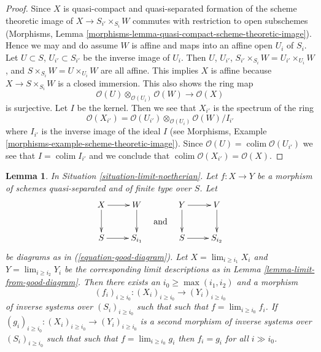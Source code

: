 \documentclass{stacks-project}
\theoremstyle{plain}
\newtheorem{lemma}[subsection]{Lemma}
\theoremstyle{definition}
\theoremstyle{remark}
\numberwithin{equation}{subsection}
\def\lim{\mathop{\mathrm{lim}}\nolimits}
\def\colim{\mathop{\mathrm{colim}}\nolimits}
\begin{document}
\begin{proof}
Since $X$ is quasi-compact and quasi-separated formation of the
scheme theoretic image of $X \to S_{i'} \times_{S_i} W$
commutes with restriction to open subschemes
(Morphisms, Lemma \ref{morphisms-lemma-quasi-compact-scheme-theoretic-image}).
Hence we may and do assume $W$ is affine and maps into an affine open
$U_i$ of $S_i$. Let $U \subset S$, $U_{i'} \subset S_{i'}$
be the inverse image of $U_i$. Then $U$, $U_{i'}$, 
$S_{i'} \times_{S_i} W = U_{i'} \times_{U_i} W$, and
$S \times_{S_i} W = U \times_{U_i} W$ are all affine.
This implies $X$ is affine because $X \to S \times_{S_i} W$ is
a closed immersion. This also shows the ring map
$$
\mathcal{O}(U) \otimes_{\mathcal{O}(U_i)} \mathcal{O}(W) \to
\mathcal{O}(X)
$$
is surjective. Let $I$ be the kernel. Then we see that $X_{i'}$
is the spectrum of the ring
$$
\mathcal{O}(X_{i'}) =
\mathcal{O}(U_{i'}) \otimes_{\mathcal{O}(U_i)} \mathcal{O}(W)/I_{i'}
$$
where $I_{i'}$ is the inverse image of the ideal $I$ (see
Morphisms, Example \ref{morphisms-example-scheme-theoretic-image}).
Since $\mathcal{O}(U) = \colim \mathcal{O}(U_{i'})$
we see that $I = \colim I_{i'}$ and we conclude
that $\colim \mathcal{O}(X_{i'}) = \mathcal{O}(X)$.
\end{proof}

\begin{lemma}
\label{lemma-morphism-good-diagram}
In Situation \ref{situation-limit-noetherian}.
Let $f : X \to Y$ be a morphism of schemes quasi-separated
and of finite type over $S$. Let
$$
\vcenter{
\xymatrix{
X \ar[r] \ar[d] & W \ar[d] \\
S \ar[r] & S_{i_1}
}
}
\quad\text{and}\quad
\vcenter{
\xymatrix{
Y \ar[r] \ar[d] & V \ar[d] \\
S \ar[r] & S_{i_2}
}
}
$$
be diagrams as in (\ref{equation-good-diagram}). Let
$X = \lim_{i \geq i_1} X_i$ and
$Y = \lim_{i \geq i_2} Y_i$ be the corresponding
limit descriptions as in Lemma \ref{lemma-limit-from-good-diagram}.
Then there exists an $i_0 \geq \max(i_1, i_2)$ and a morphism
$$
(f_i)_{i \geq i_0} : (X_i)_{i \geq i_0} \to (Y_i)_{i \geq i_0}
$$
of inverse systems over $(S_i)_{i \geq i_0}$ such that
such that $f = \lim_{i \geq i_0} f_i$.
If $(g_i)_{i \geq i_0} : (X_i)_{i \geq i_0} \to (Y_i)_{i \geq i_0}$
is a second morphism of inverse systems over $(S_i)_{i \geq i_0}$ such that
such that $f = \lim_{i \geq i_0} g_i$
then $f_i = g_i$ for all $i \gg i_0$.
\end{lemma}
\end{document}
